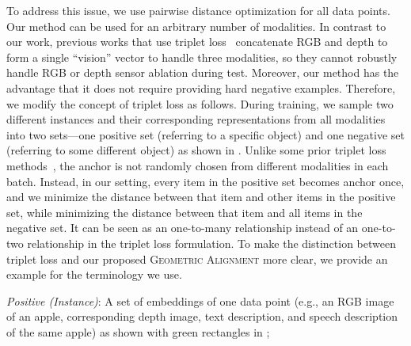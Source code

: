 \documentclass[sigconf,natbib=true,anonymous=true]{acmart}
\newcommand{\todokdinline}[1]{\todo[color=red!20,inline]{{KD: \small #1}}}
\newcommand{\todoffinline}[1]{\todo[inline,color=blue!20]{\small #1 -- Frank}}
\newcommand{\geom}{\textsc{Geometric Alignment}}
\begin{document}
To address this issue, we use pairwise distance optimization for all data points. %
Our method can be used for an arbitrary number of modalities. %
In contrast to our work, previous works that use triplet loss~\citep{GoLD_UMBC,triplet_loss_2021_CVPR} concatenate RGB and depth to form a single ``vision'' vector to handle three modalities, so they cannot robustly handle RGB or depth sensor ablation during test.
Moreover, our method has the advantage that it does not require providing hard negative examples.
Therefore, we modify the concept of triplet loss as follows. During training, we sample two different instances and their corresponding representations from all modalities into two sets---one positive set (referring to a specific object) and one negative set (referring to some different object) as shown in .
Unlike some prior triplet loss methods~\citep{GoLD_UMBC,triplet_loss_2021_CVPR}, the anchor is not randomly chosen from different modalities in each batch. Instead, in our setting, every item in the positive set becomes anchor once, and we minimize the distance between that item and other items in the positive set, while minimizing the distance between that item and all items in the negative set. It can be seen as an one-to-many relationship instead of an one-to-two relationship in the triplet loss formulation.
To make the distinction between triplet loss and our proposed \geom{} more clear, we provide an example for the terminology we use.
    
    \textit{Positive (Instance)}: A set of embeddings of one data point (e.g., an RGB image of an apple, corresponding depth image, text description, and speech description of the same apple) as shown with green rectangles in ;
    
\end{document}
